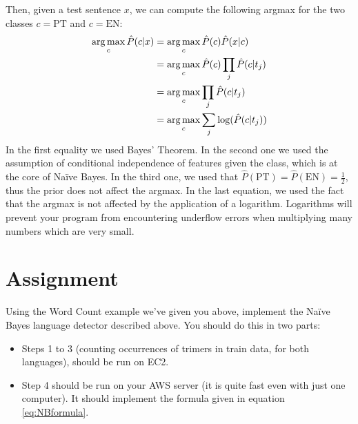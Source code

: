Then, given a test sentence $x$, we can compute the following argmax for the two classes $c = \text{PT}$ and $c = \text{EN}$:
%
\begin{eqnarray}
\operatorname*{arg\,max}_c {\hat P}(c | x) &= \operatorname*{arg\,max}_c {\hat P}(c) {\hat P}(x | c) \nonumber\\
&= \operatorname*{arg\,max}_c {\hat P}(c) \prod_j {\hat P}(c | t_j) \nonumber\\
&= \operatorname*{arg\,max}_c \prod_j {\hat P}(c | t_j) \nonumber\\
&= \operatorname*{arg\,max}_c \sum_j \log({\hat P}(c | t_j))\label{eq:NBformula}
\end{eqnarray}
%
In the first equality we used Bayes' Theorem. In the second one we used the assumption of conditional independence of features given the class, which is at the core of Na\"{i}ve Bayes. In the third one, we used that ${\hat P}(\text{PT}) = {\hat P}(\text{EN}) = \frac{1}{2}$, thus the prior does not affect the argmax. In the last equation, we used the fact that the argmax is not affected by the application of a logarithm. Logarithms will prevent your program from encountering underflow errors when multiplying many numbers which are very small.

\section{Assignment}

Using the Word Count example we've given you above, implement the Na\"{i}ve Bayes language detector described above. You should do this in two parts:

\begin{itemize}
	\item Steps 1 to 3 (counting occurrences of trimers in train data, for both languages), should be run on EC2. 
	\item Step 4 should be run on your AWS server (it is quite fast even with just one computer). It should implement the formula given in equation \eqref{eq:NBformula}.
\end{itemize}

%
%
%
%

